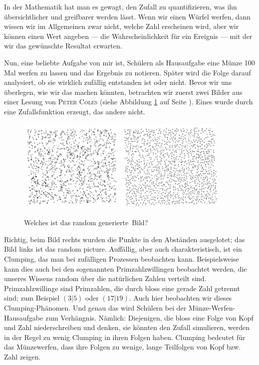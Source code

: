 \documentclass[%
11pt,%
twoside,%
titlepage,%
german,%
headsepline%
]{scrartcl}
\newcommand{\definition}[1]{\colorbox{emerald}{#1}}
\begin{document}
In der Mathematik hat man es gewagt, den Zufall zu quantifizieren, was ihn über\-sich\-tli\-cher und greifbarer werden lässt. Wenn wir einen Würfel werfen, dann wissen wir im Allgemeinen zwar nicht, welche Zahl erscheinen wird, aber wir können einen Wert angeben --- die Wahrscheinlichkeit für ein Ereignis --- mit der wir das gewünschte Resultat erwarten.

Nun, eine beliebte Aufgabe von mir ist, Schülern als Hausaufgabe eine Münze 100 Mal werfen zu lassen und das Ergebnis zu notieren. Später wird die Folge darauf analysiert, ob sie wirklich zufällig entstanden ist oder nicht. Bevor wir uns überlegen, wie wir das machen könnten, betrachten wir zuerst zwei Bilder aus einer Lesung von \textsc{Peter Coles} (siehe Abbildung \ref{fig:randomness} auf Seite \pageref{fig:randomness}). Eines wurde durch eine Zufallsfunktion erzeugt, das andere nicht.  

\begin{figure}[h]
    \centering
    \includegraphics[width=0.45\textwidth]{pictures/pointa.jpg}
    \includegraphics[width=0.45\textwidth]{pictures/pointb.jpg}
    \caption{Welches ist das \glqq random generierte\grqq\ Bild?}
    \label{fig:randomness}
\end{figure}

Richtig, beim Bild rechts wurden die Punkte in den Abständen ausgelotet; das Bild links ist das random picture. Auffällig, aber auch charakteristisch, ist ein \glqq Clumping\grqq, das man bei zufälligen Prozessen beobachten kann. Beispielsweise kann dies auch bei den sogenannten Primzahlzwillingen beobachtet werden, die unseres Wissens random über die natürlichen Zahlen verteilt sind. \definition{Primzahlzwillinge} sind Primzahlen, die durch bloss eine gerade Zahl getrennt sind; zum Beispiel $(3|5)$ oder $(17|19)$. Auch hier beobachten wir dieses Clumping-Phänomen. Und genau das wird Schülern bei der Münze-Werfen-Hausaufgabe zum Verhängnis. Nämlich: Diejenigen, die bloss eine Folge von Kopf und Zahl niederschreiben und denken, sie könnten den Zufall simulieren, werden in der Regel zu wenig Clumping in ihren Folgen haben. Clumping bedeutet für das Münzewerfen, dass ihre Folgen zu wenige, lange Teilfolgen von Kopf bzw. Zahl zeigen.
\end{document}
